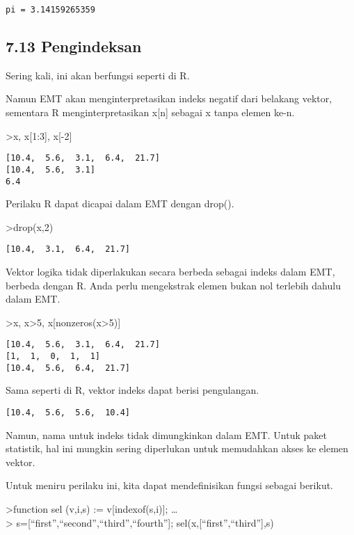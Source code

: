 \documentclass[
]{book}
\begin{document}
\begin{verbatim}
pi = 3.14159265359
\end{verbatim}

\subsection{7.13 Pengindeksan}\label{pengindeksan}

Sering kali, ini akan berfungsi seperti di R.

Namun EMT akan menginterpretasikan indeks negatif dari belakang vektor, sementara R menginterpretasikan x{[}n{]} sebagai x tanpa elemen ke-n.

\textgreater x, x{[}1:3{]}, x{[}-2{]}

\begin{verbatim}
[10.4,  5.6,  3.1,  6.4,  21.7]
[10.4,  5.6,  3.1]
6.4
\end{verbatim}

Perilaku R dapat dicapai dalam EMT dengan drop().

\textgreater drop(x,2)

\begin{verbatim}
[10.4,  3.1,  6.4,  21.7]
\end{verbatim}

Vektor logika tidak diperlakukan secara berbeda sebagai indeks dalam EMT, berbeda dengan R. Anda perlu mengekstrak elemen bukan nol terlebih dahulu dalam EMT.

\textgreater x, x\textgreater5, x{[}nonzeros(x\textgreater5){]}

\begin{verbatim}
[10.4,  5.6,  3.1,  6.4,  21.7]
[1,  1,  0,  1,  1]
[10.4,  5.6,  6.4,  21.7]
\end{verbatim}

Sama seperti di R, vektor indeks dapat berisi pengulangan.

\begin{verbatim}
[10.4,  5.6,  5.6,  10.4]
\end{verbatim}

Namun, nama untuk indeks tidak dimungkinkan dalam EMT. Untuk paket statistik, hal ini mungkin sering diperlukan untuk memudahkan akses ke elemen vektor.

Untuk meniru perilaku ini, kita dapat mendefinisikan fungsi sebagai berikut.

\textgreater function sel (v,i,s) := v{[}indexof(s,i){]}; \ldots{}\\
\textgreater{} s={[}``first'',``second'',``third'',``fourth''{]}; sel(x,{[}``first'',``third''{]},s)
\end{document}
